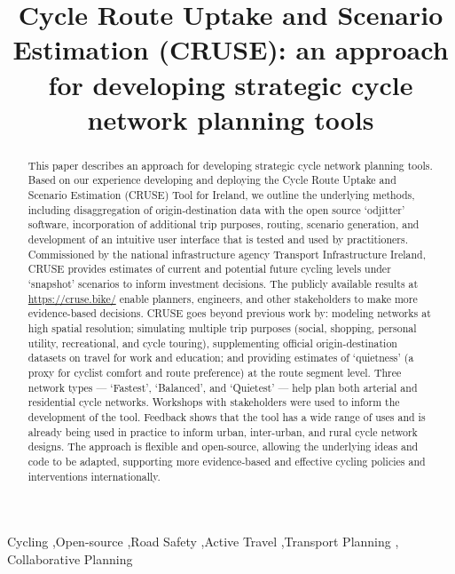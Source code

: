 \documentclass[
  super,
  preprint,
  3p]{elsarticle}
\begin{document}
\begin{frontmatter}
\title{Cycle Route Uptake and Scenario Estimation (CRUSE): an approach
for developing strategic cycle network planning tools}
        
\begin{abstract}
This paper describes an approach for developing strategic cycle network
planning tools. Based on our experience developing and deploying the
Cycle Route Uptake and Scenario Estimation (CRUSE) Tool for Ireland, we
outline the underlying methods, including disaggregation of
origin-destination data with the open source `odjitter' software,
incorporation of additional trip purposes, routing, scenario generation,
and development of an intuitive user interface that is tested and used
by practitioners. Commissioned by the national infrastructure agency
Transport Infrastructure Ireland, CRUSE provides estimates of current
and potential future cycling levels under `snapshot' scenarios to inform
investment decisions. The publicly available results at
\url{https://cruse.bike/} enable planners, engineers, and other
stakeholders to make more evidence-based decisions. CRUSE goes beyond
previous work by: modeling networks at high spatial resolution;
simulating multiple trip purposes (social, shopping, personal utility,
recreational, and cycle touring), supplementing official
origin-destination datasets on travel for work and education; and
providing estimates of `quietness' (a proxy for cyclist comfort and
route preference) at the route segment level. Three network types ---
`Fastest', `Balanced', and `Quietest' --- help plan both arterial and
residential cycle networks. Workshops with stakeholders were used to
inform the development of the tool. Feedback shows that the tool has a
wide range of uses and is already being used in practice to inform
urban, inter-urban, and rural cycle network designs. The approach is
flexible and open-source, allowing the underlying ideas and code to be
adapted, supporting more evidence-based and effective cycling policies
and interventions internationally.
\end{abstract}





\begin{keyword}
    Cycling \sep Open-source \sep Road Safety \sep Active
Travel \sep Transport Planning \sep 
    Collaborative Planning
\end{keyword}
\end{frontmatter}
    
\end{document}
